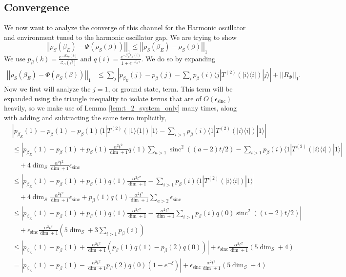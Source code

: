 \documentclass{article}
\newcommand{\ket}[1]{|#1\rangle}
\newcommand{\bra}[1]{\langle #1|}
\newcommand{\ketbra}[2]{| #1\rangle\! \langle #2|}
\newcommand{\parens}[1]{\left( #1 \right)}
\newcommand{\norm}[1]{\left| \left| #1 \right| \right|}
\newcommand{\bigo}[1]{O\left( #1 \right)}
\newcommand{\partfun}{\mathcal{Z}}
\DeclareMathOperator{\sinc}{sinc}
\begin{document}
\subsection{Convergence}
We now want to analyze the converge of this channel for the Harmonic oscillator and environment tuned to the harmonic oscillator gap. We are trying to show
\begin{equation}
    \norm{\rho_S(\beta_E) - \Phi(\rho_S(\beta))}_1 \leq \norm{\rho_S(\beta_E) - \rho_S(\beta)}_1
\end{equation}
We use $p_{\beta}(k) = \frac{e^{-\beta \lambda_S(k)}}{\partfun_S(\beta)}$ and $q(i) = \frac{e^{-\beta_E \lambda_E(i)}}{1 + e^{-\beta_E \gamma}}$.
We do so by expanding
\begin{align}
    \norm{\rho_S(\beta_E) - \Phi(\rho_S(\beta))}_1 &\leq \sum_j \left| p_{\beta_E}(j) - p_{\beta}(j) - \sum_i p_{\beta}(i) \bra{j}T^{(2)}(\ketbra{i}{i})\ket{j} \right| + \norm{R_{\Phi}}_1.
\end{align}
Now we first will analyze the $j=1$, or ground state, term. This term will be expanded using the triangle inequality to isolate terms that are of $\bigo{\epsilon_{\sinc}}$ heavily, so we make use of Lemma \ref{lem:t_2_system_only} many times, along with adding and subtracting the same term implicitly,
\begin{align}
    &\left| p_{\beta_E}(1) - p_{\beta}(1) - p_{\beta}(1) \bra{1} T^{(2)}(\ketbra{1}{1})\ket{1} - \sum_{i > 1} p_{\beta}(i) \bra{1} T^{(2)}(\ketbra{i}{i})\ket{1} \right| \\
    &\leq \left| p_{\beta_E}(1) - p_{\beta}(1) + p_{\beta}(1) \frac{\alpha^2 t^2}{\dim + 1} q(1) \sum_{a > 1} \sinc^2((a  - 2)t/2) - \sum_{i > 1} p_{\beta}(i) \bra{1} T^{(2)}(\ketbra{i}{i})\ket{1} \right| \nonumber \\
    & \quad +4 \dim_S \frac{\alpha^2 t^2}{\dim + 1} \epsilon_{\sinc} \\
    &\leq \left| p_{\beta_E}(1) - p_{\beta}(1) + p_{\beta}(1) q(1) \frac{\alpha^2 t^2}{\dim + 1} - \sum_{i > 1} p_{\beta}(i) \bra{1} T^{(2)}(\ketbra{i}{i})\ket{1} \right| \nonumber \\
    &\quad + 4 \dim_S \frac{\alpha^2 t^2}{\dim + 1} \epsilon_{\sinc} + p_{\beta}(1) q(1) \frac{\alpha^2 t^2}{\dim + 1} \sum_{a > 2} \epsilon_{\sinc} \\
    &\leq \left| p_{\beta_E}(1) - p_{\beta}(1) + p_{\beta}(1) q(1) \frac{\alpha^2 t^2}{\dim + 1} - \frac{\alpha^2 t^2}{\dim + 1}\sum_{i > 1} p_{\beta}(i) q(0) \sinc^2((i - 2)t/2) \right| \nonumber \\
    &\quad + \epsilon_{\sinc} \frac{\alpha^2 t^2}{\dim + 1} \parens{5 \dim_S + 3 \sum_{i > 1} p_{\beta}(i)} \\
    &\leq \left| p_{\beta_E}(1) - p_{\beta}(1) + \frac{\alpha^2 t^2}{\dim + 1} (p_{\beta}(1) q(1) - p_{\beta}(2) q(0))  \right| + \epsilon_{\sinc}\frac{\alpha^2 t^2}{\dim + 1} (5 \dim_S + 4) \\
    &= \left| p_{\beta_E}(1) - p_{\beta}(1) - \frac{\alpha^2 t^2}{\dim + 1} p_{\beta}(2)q(0) (1 - e^{ - \delta})  \right| + \epsilon_{\sinc}\frac{\alpha^2 t^2}{\dim + 1} (5 \dim_S + 4) \\
\end{align}
\end{document}
